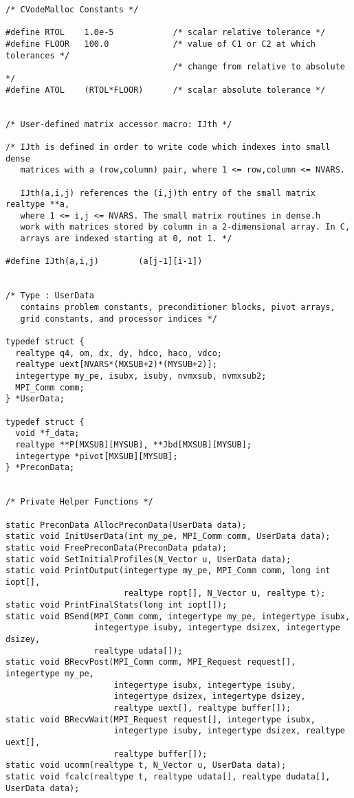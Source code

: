 \begin{verbatim}
/* CVodeMalloc Constants */

#define RTOL    1.0e-5            /* scalar relative tolerance */
#define FLOOR   100.0             /* value of C1 or C2 at which tolerances */
                                  /* change from relative to absolute      */
#define ATOL    (RTOL*FLOOR)      /* scalar absolute tolerance */


/* User-defined matrix accessor macro: IJth */

/* IJth is defined in order to write code which indexes into small dense
   matrices with a (row,column) pair, where 1 <= row,column <= NVARS.   

   IJth(a,i,j) references the (i,j)th entry of the small matrix realtype **a,
   where 1 <= i,j <= NVARS. The small matrix routines in dense.h
   work with matrices stored by column in a 2-dimensional array. In C,
   arrays are indexed starting at 0, not 1. */

#define IJth(a,i,j)        (a[j-1][i-1])


/* Type : UserData 
   contains problem constants, preconditioner blocks, pivot arrays, 
   grid constants, and processor indices */

typedef struct {
  realtype q4, om, dx, dy, hdco, haco, vdco;
  realtype uext[NVARS*(MXSUB+2)*(MYSUB+2)];
  integertype my_pe, isubx, isuby, nvmxsub, nvmxsub2;
  MPI_Comm comm;
} *UserData;

typedef struct {
  void *f_data;
  realtype **P[MXSUB][MYSUB], **Jbd[MXSUB][MYSUB];
  integertype *pivot[MXSUB][MYSUB];
} *PreconData;


/* Private Helper Functions */

static PreconData AllocPreconData(UserData data);
static void InitUserData(int my_pe, MPI_Comm comm, UserData data);
static void FreePreconData(PreconData pdata);
static void SetInitialProfiles(N_Vector u, UserData data);
static void PrintOutput(integertype my_pe, MPI_Comm comm, long int iopt[],
                        realtype ropt[], N_Vector u, realtype t);
static void PrintFinalStats(long int iopt[]);
static void BSend(MPI_Comm comm, integertype my_pe, integertype isubx,
                  integertype isuby, integertype dsizex, integertype dsizey,
                  realtype udata[]);
static void BRecvPost(MPI_Comm comm, MPI_Request request[], integertype my_pe,
                      integertype isubx, integertype isuby,
                      integertype dsizex, integertype dsizey,
                      realtype uext[], realtype buffer[]);
static void BRecvWait(MPI_Request request[], integertype isubx,
                      integertype isuby, integertype dsizex, realtype uext[],
                      realtype buffer[]);
static void ucomm(realtype t, N_Vector u, UserData data);
static void fcalc(realtype t, realtype udata[], realtype dudata[], UserData data);


\end{verbatim}
